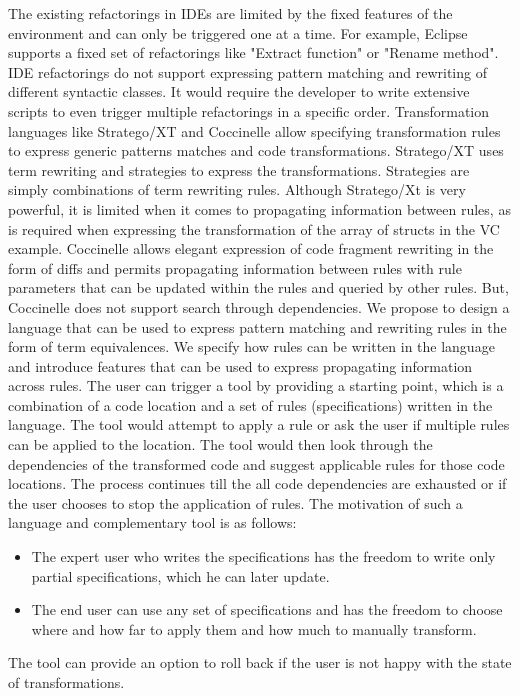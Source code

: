 \documentclass[preprint]{sigplanconf}
\begin{document}
              The existing refactorings in IDEs are limited by the fixed features of the environment and can only be triggered one at a time. For example, Eclipse supports a fixed set of refactorings like "Extract function" or "Rename method".  IDE refactorings do not support expressing pattern matching and rewriting of different syntactic classes. It would require the developer to write extensive scripts to even trigger multiple refactorings in a specific order.  Transformation languages like Stratego/XT and Coccinelle allow specifying transformation rules to express generic patterns matches and code transformations. Stratego/XT uses term rewriting and strategies to express the transformations. Strategies are simply combinations of term rewriting rules. Although Stratego/Xt is very powerful, it is limited when it comes to propagating information between rules, as is required when expressing the transformation of the array of structs in the VC example. Coccinelle allows elegant expression of code fragment rewriting in the form of diffs and permits propagating information between rules with rule parameters that can be updated within the rules and queried by other rules. But, Coccinelle does not support search through dependencies.
              We propose to design a language that can be used to express pattern matching and rewriting rules in the form of term equivalences. We specify how rules can be written in the language and introduce features that can be used to express propagating information across rules. The user can trigger a tool by providing a starting point, which is a combination of a code location and a set of rules (specifications) written in the language. The tool would attempt to apply a rule or ask the user if multiple rules can be applied to the location. The tool would then look through the dependencies of the transformed code and suggest applicable rules for those code locations. The process continues till the all code dependencies are exhausted or if the user chooses to stop the application of rules. The motivation of such a language and complementary tool is as follows:
\begin{itemize}
\item The expert user who writes the specifications has the freedom to write only partial specifications, which he can later update.
\item The end user can use any set of specifications and has the freedom to choose where and how far to apply them and how much to manually transform.
\end{itemize}
The tool can provide an option to roll back if the user is not happy with the state of transformations.
\end{document}
